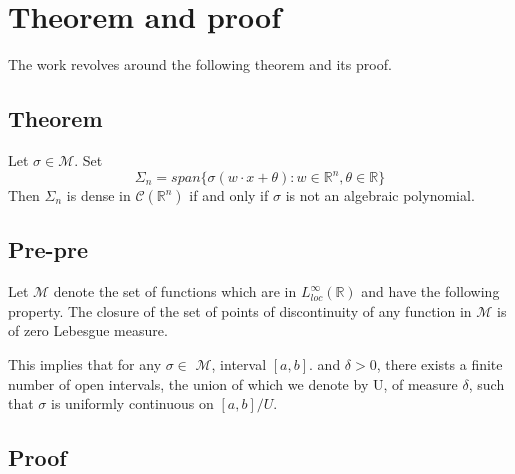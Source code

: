 \documentclass[../main.tex]{subfiles}
\begin{document}
	\chapter{Theorem and proof} \label{ch:proof}
\noindent  The work revolves around the following theorem and its proof. 
	\section{Theorem}
	\begin{theorem} Let $ \sigma \in  \mathcal{M}$. Set
		$$ \Sigma_n = span\{\sigma(w\cdot x + \theta) : w\in \mathbb{R}^n, \theta \in \mathbb{R} \}$$
		Then $\Sigma_n$ is dense in $\mathcal{C}(\mathbb{R}^n)$ if and only if $\sigma$ is not an algebraic polynomial. 
		
	\end{theorem}
\section{Pre-pre}

\begin{definition} Let  $\mathcal{M}$ denote the set of functions which are in $L_{loc}^{\infty}(\mathbb{R})$ and have the following property. The closure of the set of points of discontinuity of any function in $\mathcal{M}$ is of zero Lebesgue measure. 
\end{definition}
\noindent This implies that for any $\sigma \in$ $\mathcal{M}$, interval $[a,b] .$ and $\delta >0$, there exists a finite number of open intervals, the union of which we denote by U, of measure $\delta$, such that $\sigma$ is uniformly continuous on $[a,b]/U$. 


	\section{Proof}
\end{document}
